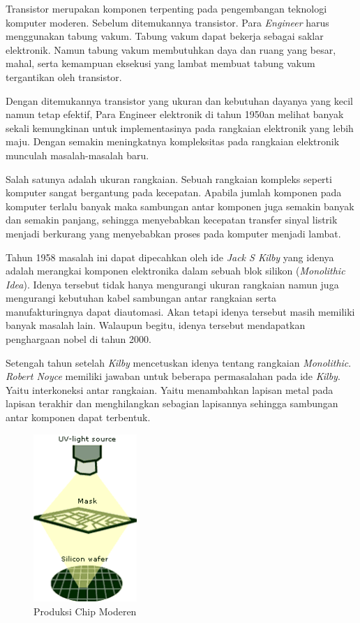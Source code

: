 Transistor merupakan komponen terpenting pada pengembangan teknologi komputer moderen. Sebelum ditemukannya transistor. Para \textit{Engineer} harus menggunakan tabung vakum. Tabung vakum dapat bekerja sebagai saklar elektronik. Namun tabung vakum membutuhkan daya dan ruang yang besar, mahal, serta kemampuan eksekusi yang lambat membuat tabung vakum tergantikan oleh transistor.

Dengan ditemukannya transistor yang ukuran dan kebutuhan dayanya yang kecil namun tetap efektif, Para Engineer elektronik di tahun 1950an melihat banyak sekali kemungkinan untuk implementasinya pada rangkaian elektronik yang lebih maju. Dengan semakin meningkatnya kompleksitas pada rangkaian elektronik munculah masalah-masalah baru.

Salah satunya adalah ukuran rangkaian. Sebuah rangkaian kompleks seperti komputer sangat bergantung pada kecepatan. Apabila jumlah komponen pada komputer terlalu banyak maka sambungan antar komponen juga semakin banyak dan semakin panjang, sehingga menyebabkan kecepatan transfer sinyal listrik menjadi berkurang yang menyebabkan proses pada komputer menjadi lambat.

Tahun 1958 masalah ini dapat dipecahkan oleh ide \textit{Jack S Kilby} yang idenya adalah merangkai komponen elektronika dalam sebuah blok silikon (\textit{Monolithic Idea}). Idenya tersebut tidak hanya mengurangi ukuran rangkaian namun juga mengurangi kebutuhan kabel sambungan antar rangkaian serta manufakturingnya dapat diautomasi. Akan tetapi idenya tersebut masih memiliki banyak masalah lain. Walaupun begitu, idenya tersebut mendapatkan penghargaan nobel di tahun 2000.

Setengah tahun setelah \textit{Kilby} mencetuskan idenya tentang rangkaian \textit{Monolithic}. \textit{Robert Noyce} memiliki jawaban untuk beberapa permasalahan pada ide \textit{Kilby}. Yaitu interkoneksi antar rangkaian. Yaitu menambahkan lapisan metal pada lapisan terakhir dan menghilangkan sebagian lapisannya sehingga sambungan antar komponen dapat terbentuk.

\begin{figure}
	\centering
	\includegraphics[width=0.35\textwidth]
	{pics/steping.png}
	\caption{Produksi Chip Moderen}
	\label{fig:produksiChipModeren}
\end{figure}


